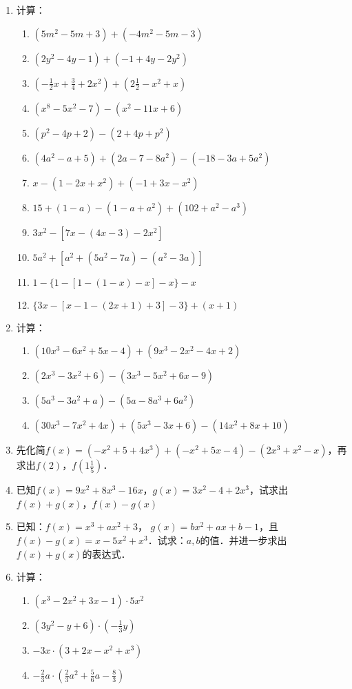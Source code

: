 \begin{enumerate}
\item 计算：
\begin{enumerate}
\item 
    $\left(5 m^{2}-5 m+3\right)+\left(-4 m^{2}-5 m-3\right)$
    \item     $\left(2 y^{2}-4 y-1\right)+\left(-1+4 y-2 y^{2}\right)$
    \item     $\left(-\frac{1}{2} x+\frac{3}{4}+2 x^{2}\right)+\left(2 \frac{1}{2}-x^{2}+x\right)$
    \item     $\left(x^{8}-5 x^{2}-7\right)-\left(x^{2}-11 x+6\right)$
    \item     $\left(p^{2}-4 p+2\right)-\left(2+4 p+p^{2}\right)$
    \item     $\left(4 a^{2}-a+5\right)+\left(2 a-7-8 a^{2}\right)-(-18-3 a+5 a^{2})$
    \item     $x-\left(1-2 x+x^{2}\right)+\left(-1+3 x-x^{2}\right)$
    \item    $15+(1-a)-\left(1-a+a^{2}\right)+\left(102+a^{2}-a^{3}\right)$
    \item    $3 x^{2}-\left[7 x-(4 x-3)-2 x^{2}\right]$
    \item   $5a^2+[a^2+(5a^2-7a)-(a^2-3a)]$
    \item $1-\{1-[1-(1-x)-x]-x\}-x$
    \item $\{3x-[x-1-(2x+1)+3]-3\}+(x+1)$
\end{enumerate}

    \item 计算：
    \begin{enumerate}
        \item $\left(10 x^{3}-6 x^{2}+5 x-4\right)+\left(9 x^{3}-2 x^{2}-4 x+2\right)$
        \item $\left(2 x^{3}-3 x^{2}+6\right)-\left(3 x^{3}-5 x^{2}+6 x-9\right)$
        \item $\left(5 a^{3}-3 a^{2}+a\right)-\left(5 a-8 a^{3}+6 a^{2}\right)$
        \item $\left(30 x^{3}-7 x^{2}+4 x\right)+\left(5 x^{3}-3 x+6\right)-(14 x^{2}+8 x+10)$
\end{enumerate}

\item 先化简$f(x)=(-x^2+5+4x^3)+(-x^2+5x-4)-(2x^3+x^2-x)$，再求出$f(2)$，$f\left(1\frac{1}{5}\right)$．
\item 已知$f(x)=9x^2+8x^3-16x$，$g(x)=3x^2-4+2x^3$，试求出$f(x)+g(x)$，$f(x)-g(x)$
\item 已知：$f(x)=x^3+ax^2+3$， $g(x)=bx^2+ax+b-1$，且$f(x)-g(x)=x-5x^2+x^3$．试求：$a,b$的值．并进一步求出$f(x)+g(x)$的表达式．
\item 计算：
\begin{multicols}{2}
\begin{enumerate}
    \item $(x^3-2x^2+3x-1)\cdot 5x^2$
    \item $(3y^2-y+6)\cdot \left(-\frac{1}{3}y\right)$
    \item $-3x\cdot (3+2x-x^2+x^3)$
    \item $-\frac{2}{3}a\cdot \left(\frac{2}{3}a^2+\frac{5}{6}a-\frac{8}{3}\right)$
\end{enumerate}
    \end{multicols}


\end{enumerate}
